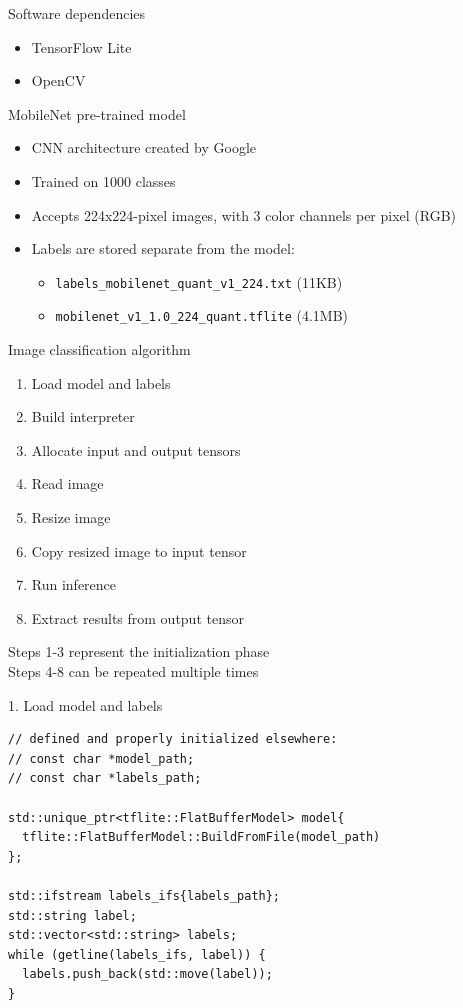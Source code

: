 \begin{frame}{Software dependencies}
  \begin{itemize}
	\item TensorFlow Lite
	\item OpenCV
  \end{itemize}
\end{frame}

\begin{frame}{MobileNet pre-trained model}
  \begin{itemize}
	\item CNN architecture created by Google
	\item Trained on 1000 classes
	\item Accepts 224x224-pixel images, with 3 color channels per pixel (RGB)
	\item Labels are stored separate from the model:
	  \begin{itemize}
		\item \texttt{labels\_mobilenet\_quant\_v1\_224.txt} (11KB)
		\item \texttt{mobilenet\_v1\_1.0\_224\_quant.tflite} (4.1MB)
	  \end{itemize}
  \end{itemize}
\end{frame}

\begin{frame}{Image classification algorithm}
  \begin{enumerate}
	\item Load model and labels
	\item Build interpreter
	\item Allocate input and output tensors
	\item Read image
	\item Resize image
	\item Copy resized image to input tensor
	\item Run inference
	\item Extract results from output tensor
  \end{enumerate}
\bigskip
Steps 1-3 represent the initialization phase \\
Steps 4-8 can be repeated multiple times
\end{frame}

\begin{frame}[fragile]{1. Load model and labels}
  \lstset{basicstyle=\ttfamily\small, numbers=left, columns=fullflexible}
  \begin{lstlisting}
// defined and properly initialized elsewhere:
// const char *model_path;
// const char *labels_path;

std::unique_ptr<tflite::FlatBufferModel> model{
  tflite::FlatBufferModel::BuildFromFile(model_path)
};

std::ifstream labels_ifs{labels_path};
std::string label;
std::vector<std::string> labels;
while (getline(labels_ifs, label)) {
  labels.push_back(std::move(label));
}
  \end{lstlisting}
\end{frame}

